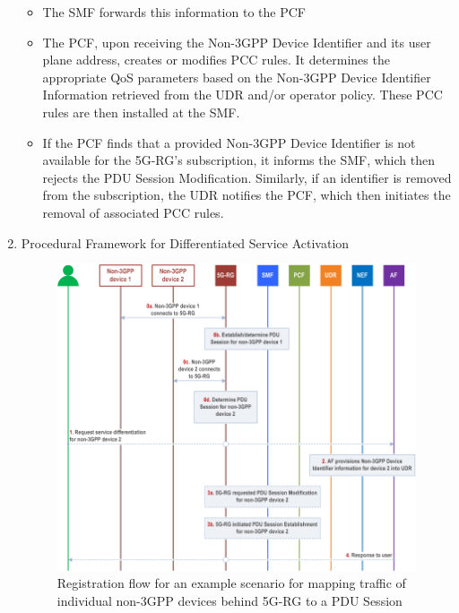 \begin{enumerate}
{\begin{itemize}
            \item The \ac{SMF} forwards this information to the \ac{PCF}~\cite{23.503-p110}
            \item The \ac{PCF}, upon receiving the Non-\ac{3GPP} Device Identifier and its user plane address, creates or modifies \ac{PCC} rules. It determines the appropriate \ac{QoS} parameters based on the Non-\ac{3GPP} Device Identifier Information retrieved from the \ac{UDR} and/or operator policy. These \ac{PCC} rules are then installed at the \ac{SMF}.
            \item If the \ac{PCF} finds that a provided Non-\ac{3GPP} Device Identifier is not available for the \ac{5G-RG}'s subscription, it informs the \ac{SMF}, which then rejects the \ac{PDU} Session Modification. Similarly, if an identifier is removed from the subscription, the \ac{UDR} notifies the \ac{PCF}, which then initiates the removal of associated \ac{PCC} rules.
        \end{itemize}
    }
    \item {
        Procedural Framework for Differentiated Service Activation ~\cite{23.316-p29}~\cite{23.316-p95}

        \begin{figure}
            \centering
            \includegraphics[width=0.75\linewidth]{figs/Example scenario for mapping traffic of individual non-3GPP devices behind 5G-RG to a PDU Session Flow.png}
            \caption{Registration flow for an example scenario for mapping traffic of individual non-\acs{3GPP} devices behind \acs{5G-RG} to a \acs{PDU} Session}
            \label{fig:Registration flow for an example scenario for mapping traffic of individual non-3GPP devices behind 5G-RG to a PDU Session}
        \end{figure}
        
}
\end{enumerate}
